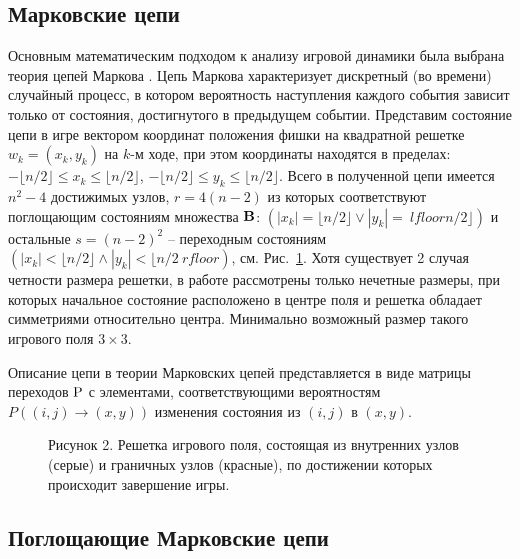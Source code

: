 \subsection{Марковские цепи}\label{subsec:ch1/sec3/sub1}

Основным математическим подходом к анализу игровой динамики была выбрана теория цепей Маркова \cite{markov_chain}.
Цепь Маркова характеризует дискретный (во времени) случайный процесс, в котором вероятность наступления каждого события 
зависит только от состояния, достигнутого в предыдущем событии. Представим состояние цепи в игре вектором координат 
положения фишки на квадратной решетке $w_k = (x_k, y_k)$ на $k$-м ходе, при этом координаты находятся в пределах: 
$-\lfloor n/2 \rfloor \leq x_k \leq \lfloor n/2 \rfloor$, $-\lfloor n/2 \rfloor \leq y_k \leq \lfloor n/2 \rfloor$. 
Всего в полученной цепи имеется $n^2-4$ достижимых узлов, $r=4(n-2)$ из которых соответствуют поглощающим состояниям множества ${\bf B}$: 
$(|x_k|=\lfloor n/2 \rfloor \lor |y_k|=\ lfloor n/2 \rfloor)$ и остальные $s=(n-2)^2$ -- переходным состояниям
$(|x_k|<\lfloor n/2 \rfloor \land |y_k|<\lfloor n/2 \ rfloor)$, см. Рис.~\cref{fig:game_field}. 
Хотя существует 2 случая четности размера решетки, в работе рассмотрены только нечетные размеры, при которых 
начальное состояние расположено в центре поля и решетка обладает симметриями относительно центра. 
Минимально возможный размер такого игрового поля $3\times 3$. 

Описание цепи в теории Марковских цепей представляется в виде матрицы переходов \cite{kemeny1983} $\rm P$ с элементами, 
соответствующими вероятностям $P((i, j) \rightarrow (x, y))$ изменения состояния из $(i, j)$ в $(x, y)$.

\begin{figure}[ht]
    \caption{
        Рисунок 2. Решетка игрового поля, состоящая из внутренних узлов (серые) и граничных узлов (красные), по достижении которых происходит завершение игры.
    }\label{fig:game_field}
\end{figure}


\subsection{Поглощающие Марковские цепи}\label{subsec:ch1/sec3/sub2}


